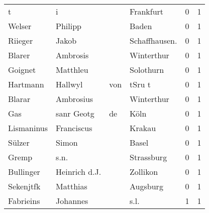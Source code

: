 \begin{tabular}{llllrr}
                        t &                                  i &             &                                   Frankfurt &          0 &         1 \\
                   Welser &                            Philipp &             &                                       Baden &          0 &         1 \\
                  Riieger &                              Jakob &             &                              Schaffhausen.  &          0 &         1 \\
                   Blarer &                           Ambrosis &             &                                  Winterthur &          0 &         1 \\
                  Goignet &                           Matthleu &             &                                   Solothurn &          0 &         1 \\
                 Hartmann &                            Hallwyl &         von &                                      tSru t &          0 &         1 \\
                   Blarar &                          Ambrosius &             &                                  Winterthur &          0 &         1 \\
                      Gas &                         sanr Geotg &          de &                                        Köln &          0 &         1 \\
               Lismaninus &                         Franciscus &             &                                      Krakau &          0 &         1 \\
                   Sülzer &                              Simon &             &                                       Basel &          0 &         1 \\
                    Gremp &                               s.n. &             &                                  Strassburg &          0 &         1 \\
                Bullinger &                      Heinrich d.J. &             &                                    Zollikon &          0 &         1 \\
                Sekenjtfk &                           Matthias &             &                                    Augsburg &          0 &         1 \\
                Fabrieins &                           Johannes &             &                                        s.l. &          1 &         1 \\

\end{tabular}

